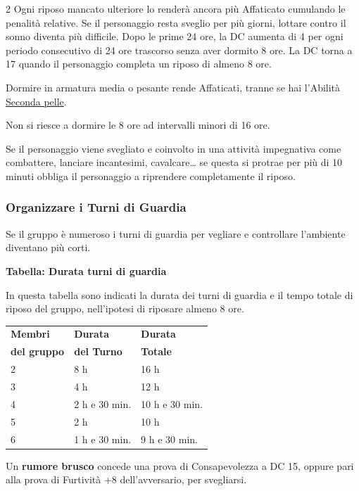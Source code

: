\begin{multicols}{2}
Ogni riposo mancato ulteriore lo renderà ancora più Affaticato cumulando le penalità relative. Se il personaggio resta sveglio per più giorni, lottare contro il sonno diventa più difficile. Dopo le prime 24 ore, la DC aumenta di 4 per ogni periodo consecutivo di 24 ore trascorso senza aver dormito 8 ore. La DC torna a 17 quando il personaggio completa un riposo di almeno 8 ore.

Dormire in armatura media o pesante rende Affaticati, tranne se hai l'Abilità \hyperlink{Seconda pelle}{Seconda pelle}.

Non si riesce a dormire le 8 ore ad intervalli minori di 16 ore.

Se il personaggio viene svegliato e coinvolto in una attività impegnativa come combattere, lanciare incantesimi, cavalcare… se questa si protrae per più di 10 minuti obbliga il personaggio a riprendere completamente il riposo.

\subsubsection{Organizzare i Turni di Guardia}

Se il gruppo è numeroso i turni di guardia per vegliare e controllare l'ambiente diventano più corti.

\medskip{}

\textbf{Tabella: Durata turni di guardia}

In questa tabella sono indicati la durata dei turni di guardia e il tempo totale di riposo del gruppo, nell'ipotesi di riposare almeno 8 ore.

\medskip{}

\noindent\begin{tabularx}{\linewidth}{XXX}
	\toprule
\rowcolor{gray!20}\textbf{Membri} &\textbf{Durata}&\textbf{Durata}\\
\textbf{del gruppo}&\textbf{del Turno}&\textbf{Totale}\\
\toprule
\rowcolor{gray!20}2& 8 h& 16 h\\
3& 4 h & 12 h\\
\rowcolor{gray!20}4& 2 h e 30 min. & 10 h e 30 min.\\
5& 2 h& 10 h\\
\rowcolor{gray!20}6& 1 h e 30 min. & 9 h e 30 min.
\end{tabularx}

\medskip{}

Un \textbf{rumore brusco} concede una prova di Consapevolezza a DC 15, oppure pari alla prova di Furtività +8 dell'avversario, per svegliarsi.

\end{multicols}

